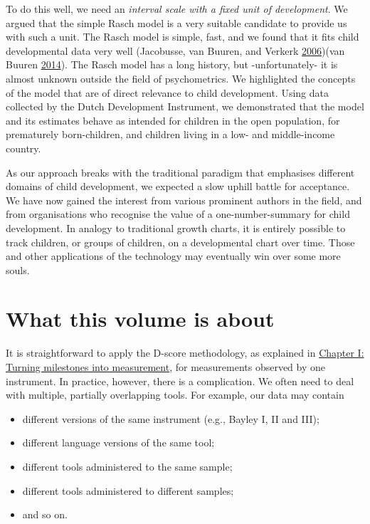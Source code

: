 \documentclass[
]{book}
\providecommand{\tightlist}{%
  \setlength{\itemsep}{0pt}\setlength{\parskip}{0pt}}
\begin{document}
To do this well, we need an \emph{interval scale with a fixed unit of development}. We argued that the simple Rasch model is a very suitable candidate to provide us with such a unit. The Rasch model is simple, fast, and we found that it fits child developmental data very well (Jacobusse, van Buuren, and Verkerk \protect\hyperlink{ref-jacobusse2006}{2006})(van Buuren \protect\hyperlink{ref-vanbuuren2014}{2014}). The Rasch model has a long history, but -unfortunately- it is almost unknown outside the field of psychometrics. We highlighted the concepts of the model that are of direct relevance to child development. Using data collected by the Dutch Development Instrument, we demonstrated that the model and its estimates behave as intended for children in the open population, for prematurely born-children, and children living in a low- and middle-income country.

As our approach breaks with the traditional paradigm that emphasises different domains of child development, we expected a slow uphill battle for acceptance. We have now gained the interest from various prominent authors in the field, and from organisations who recognise the value of a one-number-summary for child development. In analogy to traditional growth charts, it is entirely possible to track children, or groups of children, on a developmental chart over time. Those and other applications of the technology may eventually win over some more souls.

\hypertarget{sec:thisvolume}{%
\section{What this volume is about}\label{sec:thisvolume}}

It is straightforward to apply the D-score methodology, as explained in \href{https://d-score.org/dbook1}{Chapter I: Turning milestones into measurement}, for measurements observed by one instrument. In practice, however, there is a complication. We often need to deal with multiple, partially overlapping tools. For example, our data may contain

\begin{itemize}
\tightlist
\item
  different versions of the same instrument (e.g., Bayley I, II and III);
\item
  different language versions of the same tool;
\item
  different tools administered to the same sample;
\item
  different tools administered to different samples;
\item
  and so on.
\end{itemize}
\end{document}
